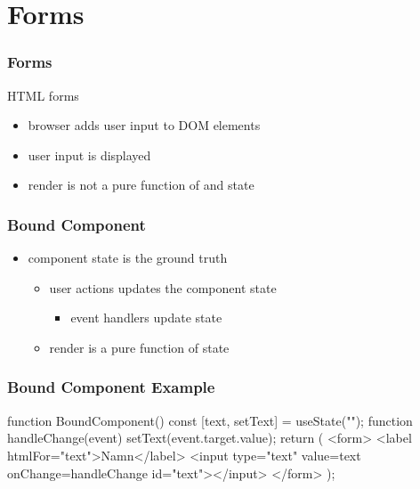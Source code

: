 \section{Forms}
\begin{frame}[fragile] \frametitle{Forms}
HTML forms
\begin{itemize}
  \item browser adds user input to DOM elements
  \item user input is displayed
  \item render is not a pure function of  and state
\end{itemize}
\end{frame}

\begin{frame}[fragile] \frametitle{Bound Component}
\begin{itemize}
  \item component state is the ground truth
  \begin{itemize}
    \item user actions updates the component state
    \begin{itemize}
      \item event handlers update state
    \end{itemize}
    \item render is a pure function of state
  \end{itemize}
\end{itemize}
\end{frame}

\begin{frame}[fragile] \frametitle{Bound Component Example}
\begin{CodeBox}{}
function BoundComponent() {
  const [text, setText] = useState("");
  function handleChange(event) {
    setText(event.target.value);
  }
  return (
    <form>
      <label htmlFor="text">Namn</label>
      <input type="text" value={text} onChange={handleChange} id="text"></input>
    </form>
  );
}
\end{CodeBox}
\end{frame}

